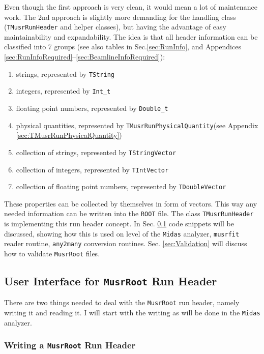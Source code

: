 \documentclass[twoside]{article}
\newcommand{\musrroot}{\texttt{MusrRoot}\xspace}
\newcommand{\rootcern}{\texttt{ROOT}\xspace}
\newcommand{\midas}{\texttt{Midas}\xspace}
\newcommand{\musrfit}{\texttt{musrfit}\xspace}
\newcommand{\anytwomany}{\texttt{any2many}\xspace}
\newcommand{\tmrh}{\texttt{TMusrRunHeader}\xspace}
\newcommand{\tstring}{\texttt{TString}\xspace}
\newcommand{\tstringvec}{\texttt{TStringVector}\xspace}
\newcommand{\tintvec}{\texttt{TIntVector}\xspace}
\newcommand{\tdoublevec}{\texttt{TDoubleVector}\xspace}
\newcommand{\tquant}{\texttt{TMusrRunPhysicalQuantity}\xspace}
\begin{document}
\noindent Even though the first approach is very clean, it would mean a lot of maintenance work. The 2nd approach is slightly more demanding for the handling class (\tmrh and helper classes), but having the advantage of easy maintainability and expandability. The idea is that all header information can be classified into 7 groups (see also tables in Sec.\ref{sec:RunInfo}, and Appendices \ref{sec:RunInfoRequired}--\ref{sec:BeamlineInfoRequired}): 

\begin{enumerate}
 \item strings, represented by \tstring
 \item integers, represented by \verb!Int_t!
 \item floating point numbers, represented by \verb!Double_t!
 \item physical quantities, represented by \tquant (see Appendix \ref{sec:TMusrRunPhysicalQuantity})
 \item collection of strings, represented by \tstringvec
 \item collection of integers, represented by \tintvec
 \item collection of floating point numbers, represented by \tdoublevec
\end{enumerate}

\noindent These properties can be collected by themselves in form of vectors. This way any needed information can be written into the \rootcern file. The class \tmrh is implementing this run header concept. In Sec. \ref{sec:UserInterface} code snippets will be discussed, showing how this is used on level of the \midas analyzer, \musrfit reader routine, \anytwomany conversion routines. Sec. \ref{sec:Validation} will discuss how to validate \musrroot files.

\subsection{User Interface for \musrroot Run Header}\label{sec:UserInterface}

There are two things needed to deal with the \musrroot run header, namely writing it and reading it. I will start with the writing as will be done in the \midas analyzer.

\subsubsection{Writing a \musrroot Run Header}\label{sec:UserInterfaceWritting}
\end{document}
